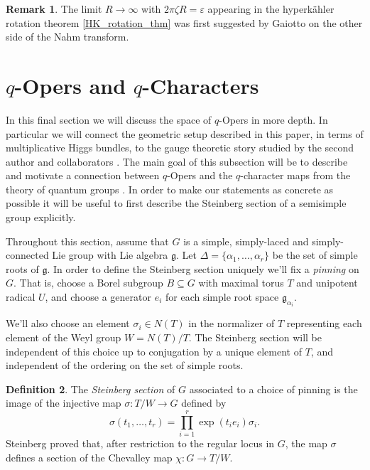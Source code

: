 \documentclass[11pt, oneside, reqno]{amsart}
\theoremstyle{definition} \newtheorem{definition}{Definition}[section]
\theoremstyle{definition} \newtheorem{remark}[definition]{Remark}
\theoremstyle{definition} \newtheorem{remarks}[definition]{Remarks}
\theoremstyle{definition} \newtheorem{question}[definition]{Question}
\theoremstyle{definition} \newtheorem*{note}{Note}
\theoremstyle{definition} \newtheorem{example}[definition]{Example}
\theoremstyle{definition} \newtheorem{examples}[definition]{Examples}
\renewcommand{\gg}{\mathfrak{g}}
\newcommand{\eps}{\varepsilon}
\newcommand{\sub}{\subseteq}
\begin{document}
\begin{remark}
  The limit $R \to \infty$ with $2 \pi \zeta R = \eps$ appearing in the hyperk\"ahler rotation
  theorem \ref{HK_rotation_thm} was first suggested by Gaiotto \cite{GaiottoTBA} on the other side of the Nahm transform.
\end{remark}

\section{$q$-Opers and $q$-Characters} \label{qchar_section}

In this final section we will discuss the space of $q$-Opers in more depth.  In particular we will connect the geometric setup described in this paper, in terms of multiplicative Higgs bundles, to the gauge theoretic story studied by the second author and collaborators \cite{NekrasovPestunShatashvili,Kimura:2015rgi,Nekrasov:2015wsu}.  The main goal of this subsection will be to describe and motivate a connection between $q$-Opers and the $q$-character maps from the theory of quantum groups \cite{FrenkelReshetikhinSTS,FrenkelReshetikhin2,FrenkelReshetikhin1,Sevostyanov,STSSevostyanov,Sevostyanov1}.  In order to make our statements as concrete as possible it will be useful to first describe the Steinberg section \cite{Steinberg} of a semisimple group explicitly.

Throughout this section, assume that $G$ is a simple, simply-laced and simply-connected Lie group with Lie algebra $\gg$.  Let $\Delta = \{\alpha_1, \ldots, \alpha_r\}$ be the set of simple roots of $\gg$.  In order to define the Steinberg section uniquely we'll fix a \emph{pinning} on $G$.  That is, choose a Borel subgroup $B \sub G$ with maximal torus $T$ and unipotent radical $U$, and choose a generator $e_i$ for each simple root space $\gg_{\alpha_i}$.

We'll also choose an element $\sigma_i \in N(T)$ in the normalizer of $T$ representing each element of the Weyl group $W = N(T)/T$.  The Steinberg section will be independent of this choice up to conjugation by a unique element of $T$, and independent of the ordering on the set of simple roots.

\begin{definition} \label{Steinberg_section_def}
The \emph{Steinberg section} of $G$ associated to a choice of pinning is the image of the injective map $\sigma \colon T/W \to G$ defined by
\[\sigma(t_1, \ldots, t_r) = \prod_{i=1}^r \exp(t_i e_i) \sigma_i.\]
Steinberg proved \cite[Theorem 1.4]{Steinberg} that, after restriction to the regular locus in $G$, the map $\sigma$ defines a section of the Chevalley map $\chi \colon G \to T/W$.
\end{definition}
\end{document}
